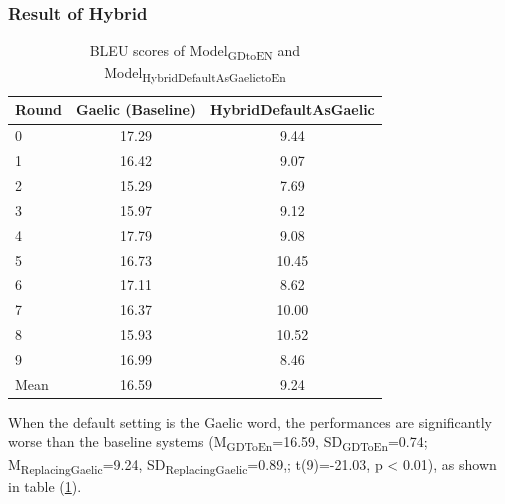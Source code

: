\documentclass[final]{ua-thesis}
\numberwithin{equation}{section}
\begin{document}
\subsubsection{Result of Hybrid}    
\begin{table}[ht]
\centering
\begin{tabular}{lcc}
  \hline
Round & Gaelic (Baseline) & HybridDefaultAsGaelic \\ 
  \hline
0 & 17.29 & 9.44 \\ 
  1 & 16.42 & 9.07 \\ 
  2 & 15.29 & 7.69 \\ 
  3 & 15.97 & 9.12 \\ 
  4 & 17.79 & 9.08 \\ 
  5 & 16.73 & 10.45 \\ 
  6 & 17.11 & 8.62 \\ 
  7 & 16.37 & 10.00 \\ 
  8 & 15.93 & 10.52 \\ 
  9 & 16.99 & 8.46 \\ 
   \hline
Mean & 16.59 & 9.24 \\ 
   \hline
\end{tabular}
\caption{BLEU scores of Model\textsubscript{GDtoEN} and Model\textsubscript{HybridDefaultAsGaelictoEn}} 
\label{Table:HybridDefaultAsGaelic}
\end{table}When the default setting is the Gaelic word, the performances are significantly worse than the baseline systems
(M\textsubscript{GDToEn}=16.59, SD\textsubscript{GDToEn}=0.74; M\textsubscript{ReplacingGaelic}=9.24, SD\textsubscript{ReplacingGaelic}=0.89,; t(9)=-21.03, p < 0.01), 
as shown in table (\ref{Table:HybridDefaultAsGaelic}).
\end{document}
